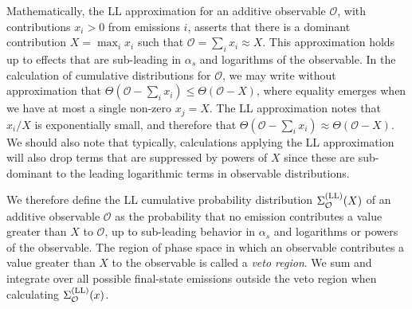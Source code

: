 \documentclass[letterpaper,11pt]{article}
\begin{document}
Mathematically, the LL approximation for an additive observable \(\mathcal{O}\), with contributions \(x_i > 0\) from emissions \(i\), asserts that there is a dominant contribution \(X = \max_i x_i\) such that \(\mathcal{O} = \sum_i x_i \approx X\).
%
This approximation holds up to effects that are sub-leading in \(\alpha_s\) and logarithms of the observable.
%
In the calculation of cumulative distributions for \(\mathcal{O}\), we may write without approximation that \(\Theta(\mathcal{O} - \sum_i x_i) \leq \Theta(\mathcal{O} - X)\), where equality emerges when we have at most a single non-zero \(x_j = X\).
%
The LL approximation notes that \(x_i / X \) is exponentially small, and therefore that \(\Theta(\mathcal{O} - \sum_i x_i) \approx \Theta(\mathcal{O} - X)\).
%
We should also note that typically, calculations applying the LL approximation will also drop terms that are suppressed by powers of \(X\) since these are sub-dominant to the leading logarithmic terms in observable distributions.

We therefore define the LL cumulative probability distribution \(\Sigma^{\rm(LL)}_{\mathcal{O}}(X)\) of an additive observable \(\mathcal{O}\) as the probability that no emission contributes a value greater than \(X\) to \(\mathcal{O}\), up to sub-leading behavior in \(\alpha_s\) and logarithms or powers of the observable.
%
The region of phase space in which an observable contributes a value greater than \(X\) to the observable is called a \textit{veto region}.
%
We sum and integrate over all possible final-state emissions outside the veto region when calculating \(\Sigma^{\rm(LL)}_{\mathcal{O}}(x)\).
\end{document}
